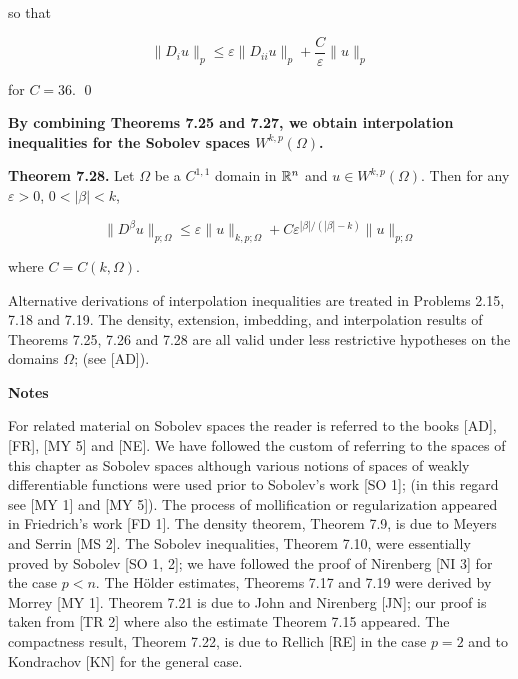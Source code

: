 so that

\[
\lVert D_i u\rVert_p \le \varepsilon \lVert D_{ii}u\rVert_p+\frac{C}{\varepsilon}\lVert u\rVert_p
\]

for $C=36$. \qed

\medskip

\textbf{By combining Theorems 7.25 and 7.27, we obtain interpolation inequalities for the Sobolev spaces $W^{k,p}(\Omega)$.}



\noindent\textbf{Theorem 7.28.} \quad Let $\Omega$ be a $C^{1,1}$ domain in $\mathbb{R}^n$ and $u \in W^{k,p}(\Omega)$. Then for any $\varepsilon > 0$, $0 < |\beta| < k$,

\begin{equation}
\tag{7.61}
\|D^\beta u\|_{p;\Omega} \le \varepsilon \|u\|_{k,p;\Omega} + C \varepsilon^{|\beta|/(|\beta|-k)}\|u\|_{p;\Omega}
\end{equation}

\noindent where $C = C(k,\Omega)$.

\medskip

Alternative derivations of interpolation inequalities are treated in Problems 2.15, 7.18 and 7.19. The density, extension, imbedding, and interpolation results of Theorems 7.25, 7.26 and 7.28 are all valid under less restrictive hypotheses on the domains $\Omega$; (see [AD]).

\bigskip

\textbf{Notes}

\medskip

For related material on Sobolev spaces the reader is referred to the books [AD], [FR], [MY 5] and [NE]. We have followed the custom of referring to the spaces of this chapter as Sobolev spaces although various notions of spaces of weakly differentiable functions were used prior to Sobolev's work [SO 1]; (in this regard see [MY 1] and [MY 5]). The process of mollification or regularization appeared in Friedrich's work [FD 1]. The density theorem, Theorem 7.9, is due to Meyers and Serrin [MS 2]. The Sobolev inequalities, Theorem 7.10, were essentially proved by Sobolev [SO 1, 2]; we have followed the proof of Nirenberg [NI 3] for the case $p < n$. The H\"older estimates, Theorems 7.17 and 7.19 were derived by Morrey [MY 1]. Theorem 7.21 is due to John and Nirenberg [JN]; our proof is taken from [TR 2] where also the estimate Theorem 7.15 appeared. The compactness result, Theorem 7.22, is due to Rellich [RE] in the case $p = 2$ and to Kondrachov [KN] for the general case.

